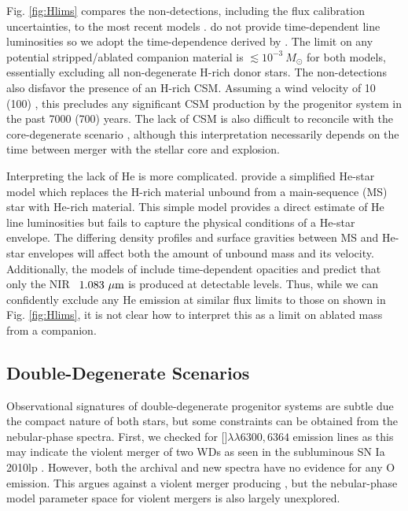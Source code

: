 \documentclass[twocolumn]{aastex63}
\begin{document}
Fig. \ref{fig:Hlims} compares the \Ha non-detections, including the flux calibration uncertainties, to the most recent models \citep{botyanszki2018, dessart2020}. \citet{botyanszki2018} do not provide time-dependent line luminosities so we adopt the time-dependence derived by \citet{tucker2020}. The limit on any potential stripped/ablated companion material is $\lesssim 10^{-3}~M_\odot$ for both models, essentially excluding all non-degenerate H-rich donor stars. The \Ha non-detections also disfavor the presence of an H-rich CSM. Assuming a wind velocity of 10 (100) \kms, this precludes any significant CSM production by the progenitor system in the past 7000 (700) years. The lack of CSM is also difficult to reconcile with the core-degenerate scenario \citep{soker2014}, although this interpretation necessarily depends on the time between merger with the stellar core and explosion.

Interpreting the lack of He is more complicated. \citet{botyanszki2018} provide a simplified He-star model which replaces the H-rich material unbound from a main-sequence (MS) star with He-rich material. This simple model provides a direct estimate of He line luminosities but fails to capture the physical conditions of a He-star envelope. The differing density profiles and surface gravities between MS and He-star envelopes will affect both the amount of unbound mass and its velocity. Additionally, the models of \citet{dessart2020} include time-dependent opacities and predict that only the NIR ~$1.083~\mu\rm m$ is produced at detectable levels. Thus, while we can confidently exclude any He emission at similar flux limits to those on \Ha shown in Fig. \ref{fig:Hlims}, it is not clear how to interpret this as a limit on ablated mass from a companion.

\subsection{Double-Degenerate Scenarios} \label{subsec:progenitor.double}

Observational signatures of double-degenerate progenitor systems are subtle due the compact nature of both stars, but some constraints can be obtained from the nebular-phase spectra. First, we checked for []$\lambda\lambda6300,6364$ emission lines as this may indicate the violent merger of two WDs \citep{kromer2013} as seen in the subluminous SN Ia 2010lp \citep{taubenberger2013}. However, both the archival and new spectra have no evidence for any O emission. This argues against a violent merger producing \name, but the nebular-phase model parameter space for violent mergers is also largely unexplored. 
\end{document}
